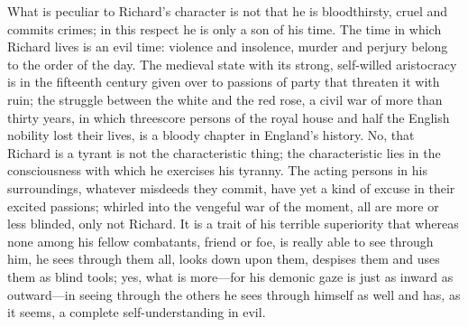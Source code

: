 \documentclass[12pt,a4paper,openany]{book}
\newcommand{\opage}[1]{\marginnote{\footnotesize\textit{[#1]}}}
\begin{document}
What is peculiar to Richard's character is not that
he is bloodthirsty, cruel and commits crimes; in
this respect he is only a son of his time. The
time in which Richard lives is an evil time: violence and insolence,
murder and perjury belong to the order of the day. The medieval
state with its strong, self-willed aristocracy
is in the fifteenth century given over to passions of party
that threaten it with ruin; the struggle between
the white and the red rose, a civil war of more than thirty years,
in which threescore persons of the royal house and half the English nobility lost
their lives, is a bloody chapter in England's history. No, that
Richard is a tyrant is not the characteristic thing; the
characteristic lies in the consciousness with which he
exercises his tyranny. The acting persons in his surroundings,
whatever misdeeds they commit, have yet
a kind of excuse in their excited passions;
whirled into the vengeful war of the moment, all are more or
less blinded, only not Richard. It is a trait
of his terrible superiority that whereas none among
his fellow combatants, friend or foe, is really able to see through
him, he sees through them all, looks down upon
them, despises them and uses them as blind tools;
yes, what is more---for his demonic gaze is just as inward as outward---in seeing through
the others he sees through himself as well
\setcounter{footnote}{0}%
\opage{531}and has, as it seems, a complete self-understanding in
evil.
\end{document}
